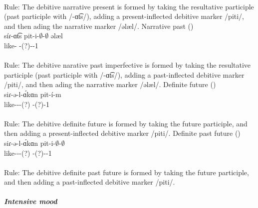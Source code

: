\begin{exe}
\begin{xlist}
		\trans {} \\
		Rule: The debitive narrative present is formed by taking the resultative participle (past participle with /-ɑt͡s/), adding a present-inflected debitive marker /piti/, and then ading the narrative marker /əlæl/. 
		\ex Narrative past    ()\\ \gll 
		s\'iɾ-ɑt͡s pit-i-$\emptyset$-$\emptyset$ əlæl \\ 
		like-{\rptcp} {\deb}-{\thgloss}(?)-{\pst}-1{\sg} {\narr} \\ 
		\trans {}\\
		Rule: The debitive narative past imperfective is formed by taking the resultative participle (past participle with /-ɑt͡s/), adding a past-inflected debitive marker /piti/, and then ading the narrative marker /əlæl/.
		\ex Definite future  () \\ \gll 
		siɾ-ə-l-\'ɑkɑn pit-\'i-m \\ 
		like-{\thgloss}-{\infgloss}-{\futcvb}(?) {\deb}-{\thgloss}(?)-1{\sg} \\ 
		\trans {}\\
		Rule: The debitive definite future is formed by taking the future participle, and then adding a present-inflected debitive marker /piti/.
		\ex Definite past future   () \\ \gll 
		siɾ-ə-l-\'ɑkɑn pit-i-$\emptyset$-$\emptyset$ \\ 
		like-{\thgloss}-{\infgloss}-{\futcvb}(?) {\deb}-{\thgloss}(?)-{\pst}-1{\sg} \\ 
		\trans {}\\
		Rule: The debitive definite past future is formed by taking the future participle, and then adding a past-inflected debitive marker /piti/. 
		
	\end{xlist}
	
	
\end{exe}



\subparagraph{Intensive mood}



